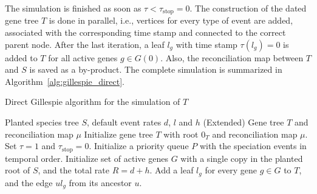 \documentclass[hidelinks,11pt]{scrreprt}
\begin{document}
The simulation is finished as soon as $\tau < \tau_{\textrm{stop}}=0$. The construction of the dated gene tree $T$ is done in parallel, i.e., vertices for every type of event are added, associated with the corresponding time stamp and connected to the correct parent node. After the last iteration, a leaf $l_g$ with time stamp $\tau(l_g)=0$ is added to $T$ for all active genes $g\in G(0)$. Also, the reconciliation map between $T$ and $S$ is saved as a by-product. The complete simulation is summarized in Algorithm~\ref{alg:gillespie_direct}.

\vspace{5mm}
{\normalsize
	\begin{algorithm}[H]
		\caption{Direct Gillespie algorithm for the simulation of $T$}
		\label{alg:gillespie_direct}
		\SetAlgoLined
		\DontPrintSemicolon
		\Input Planted species tree $S$, default event rates $d$, $l$ and $h$ \;
		\Output (Extended) Gene tree $T$ and reconciliation map $\mu$ \;
		Initialize gene tree $T$ with root $0_T$ and reconciliation map $\mu$.\;
		Set $\tau=1$ and $\tau_{\textrm{stop}}=0$.\;
		Initialize a priority queue $P$ with the speciation events in temporal order.\;
		Initialize set of active genes $G$ with a single copy in the planted root of $S$, and the total rate $R=d+h$.\;
		Add a leaf $l_g$ for every gene $g\in G$ to $T$, and the edge $ul_g$ from its ancestor $u$.\;
\end{algorithm}}
\end{document}
